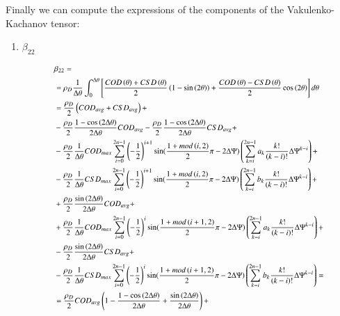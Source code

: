 \documentclass[review]{elsarticle}
\begin{document}
Finally we can compute the expressions of the components of the Vakulenko-Kachanov tensor:

\begin{enumerate}
\item $\beta_{22}$

\begin{equation}
\footnotesize
\begin{aligned}
&\beta_{22}=\\
&=\rho_{D}\frac{1}{\Delta\theta}\int_{0}^{\Delta\theta}\left[\frac{COD\left(\theta\right)+CSD\left(\theta\right)}{2}\left(1-\sin\left(2\theta\right)\right)+\frac{COD\left(\theta\right)-CSD\left(\theta\right)}{2}\cos\left(2\theta\right)\right]d\theta\\
&=\frac{\rho_{D}}{2}\left(COD_{avg}+CSD_{avg}\right)+\\
&-\frac{\rho_{D}}{2}\frac{1-\cos\left(2\Delta\theta\right)}{2\Delta\theta}COD_{avg}-\frac{\rho_{D}}{2}\frac{1-\cos\left(2\Delta\theta\right)}{2\Delta\theta}CSD_{avg}+\\
&-\frac{\rho_{D}}{2}\frac{1}{\Delta\theta}COD_{max}\sum_{i=0}^{2n-1}\left(-\frac{1}{2}\right)^{i+1}\sin(\frac{1+mod\left(i,2\right)}{2}\pi-2\Delta\Psi)\left(\sum_{k=i}^{2n-1}a_{k}\frac{k!}{\left(k-i\right)!}\Delta\Psi^{k-i}\right)+\\
&-\frac{\rho_{D}}{2}\frac{1}{\Delta\theta}CSD_{max}\sum_{i=0}^{2n-1}\left(-\frac{1}{2}\right)^{i+1}\sin(\frac{1+mod\left(i,2\right)}{2}\pi-2\Delta\Psi)\left(\sum_{k=i}^{2n-1}b_{k}\frac{k!}{\left(k-i\right)!}\Delta\Psi^{k-i}\right)+\\
&+\frac{\rho_{D}}{2}\frac{\sin\left(2\Delta\theta\right)}{2\Delta\theta}COD_{avg}+\\
&+\frac{\rho_{D}}{2}\frac{1}{\Delta\theta}COD_{max}\sum_{i=0}^{2n-1}\left(-\frac{1}{2}\right)^{i}\sin(\frac{1+mod\left(i+1,2\right)}{2}\pi-2\Delta\Psi)\left(\sum_{k=i}^{2n-1}a_{k}\frac{k!}{\left(k-i\right)!}\Delta\Psi^{k-i}\right)+\\
&-\frac{\rho_{D}}{2}\frac{\sin\left(2\Delta\theta\right)}{2\Delta\theta}CSD_{avg}+\\
&-\frac{\rho_{D}}{2}\frac{1}{\Delta\theta}CSD_{max}\sum_{i=0}^{2n-1}\left(-\frac{1}{2}\right)^{i}\sin(\frac{1+mod\left(i+1,2\right)}{2}\pi-2\Delta\Psi)\left(\sum_{k=i}^{2n-1}b_{k}\frac{k!}{\left(k-i\right)!}\Delta\Psi^{k-i}\right)=\\
&=\frac{\rho_{D}}{2}COD_{avg}\left(1-\frac{1-\cos\left(2\Delta\theta\right)}{2\Delta\theta}+\frac{\sin\left(2\Delta\theta\right)}{2\Delta\theta}\right)+\\

\end{aligned}
\end{equation}
\end{enumerate}
\end{document}

